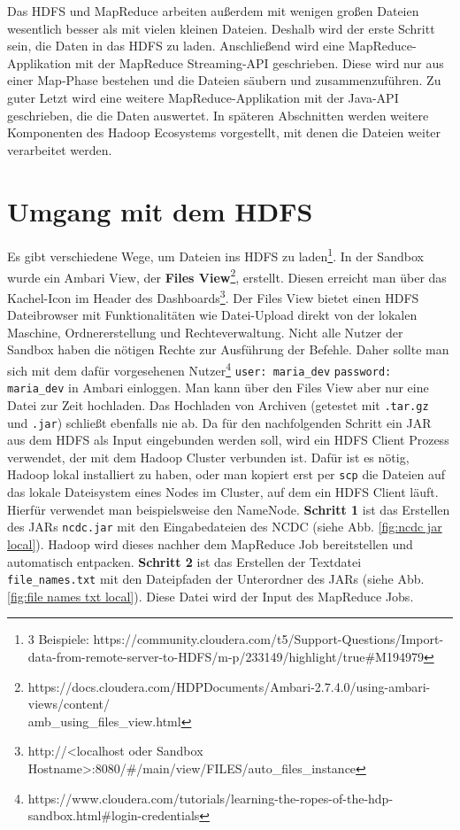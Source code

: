 Das HDFS und MapReduce arbeiten außerdem mit wenigen großen Dateien wesentlich besser als mit vielen kleinen Dateien.\cite[\textit{(S. 19-30, 693-695)}]{white_hadoop_2015} Deshalb wird der erste Schritt sein, die Daten in das HDFS zu laden. Anschließend wird eine MapReduce-Applikation mit der MapReduce Streaming-API geschrieben. Diese wird nur aus einer Map-Phase bestehen und die Dateien säubern und zusammenzuführen. Zu guter Letzt wird eine weitere MapReduce-Applikation mit der Java-API geschrieben, die die Daten auswertet. In späteren Abschnitten werden weitere Komponenten des Hadoop Ecosystems vorgestellt, mit denen die Dateien weiter verarbeitet werden.

\section{Umgang mit dem HDFS}
\label{chap:fund sec:core sub:handson hdfs}
Es gibt verschiedene Wege, um Dateien ins HDFS zu laden\footnote{3 Beispiele: https://community.cloudera.com/t5/Support-Questions/Import-data-from-remote-server-to-HDFS/m-p/233149/highlight/true\#M194979}. In der Sandbox wurde ein Ambari View, der \textbf{Files View}\footnote{https://docs.cloudera.com/HDPDocuments/Ambari-2.7.4.0/using-ambari-views/content/\\amb\_using\_files\_view.html}, erstellt. Diesen erreicht man über das Kachel-Icon im Header des Dashboards\footnote{http://<localhost oder Sandbox Hostname>:8080/\#/main/view/FILES/auto\_files\_instance}. Der Files View bietet einen HDFS Dateibrowser mit Funktionalitäten wie Datei-Upload direkt von der lokalen Maschine, Ordnererstellung und Rechteverwaltung. Nicht alle Nutzer der Sandbox haben die nötigen Rechte zur Ausführung der Befehle. Daher sollte man sich mit dem dafür vorgesehenen Nutzer\footnote{https://www.cloudera.com/tutorials/learning-the-ropes-of-the-hdp-sandbox.html\#login-credentials} \verb|user: maria_dev| \verb|password: maria_dev| in Ambari einloggen. Man kann über den Files View aber nur eine Datei zur Zeit hochladen. Das Hochladen von Archiven (getestet mit \verb|.tar.gz| und \verb|.jar|) schließt ebenfalls nie ab. Da für den nachfolgenden Schritt ein JAR aus dem HDFS als Input eingebunden werden soll, wird ein HDFS Client Prozess verwendet, der mit dem Hadoop Cluster verbunden ist. Dafür ist es nötig, Hadoop lokal installiert zu haben, oder man kopiert erst per \verb|scp| die Dateien auf das lokale Dateisystem eines Nodes im Cluster, auf dem ein HDFS Client läuft. Hierfür verwendet man beispielsweise den NameNode. 
\textbf{Schritt 1} ist das Erstellen des JARs \verb|ncdc.jar| mit den Eingabedateien des NCDC (siehe Abb. \ref{fig:ncdc jar local}). Hadoop wird dieses nachher dem MapReduce Job bereitstellen und automatisch entpacken. \textbf{Schritt 2} ist das Erstellen der Textdatei \verb|file_names.txt| mit den Dateipfaden der Unterordner des JARs (siehe Abb. \ref{fig:file names txt local}). Diese Datei wird der Input des MapReduce Jobs. 

